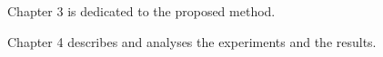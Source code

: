 Chapter 3 is dedicated to the proposed method.

Chapter 4 describes and analyses the experiments and the results.

















    


